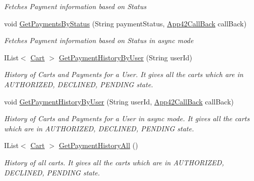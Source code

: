 \begin{DoxyCompactItemize}
\begin{DoxyCompactList}\small\item\em Fetches Payment information based on Status \end{DoxyCompactList}\item 
void \hyperlink{classcom_1_1shephertz_1_1app42_1_1paas_1_1sdk_1_1csharp_1_1shopping_1_1_cart_service_ad0ac4c348e543623ddf70326435543e8}{Get\+Payments\+By\+Status} (String payment\+Status, \hyperlink{interfacecom_1_1shephertz_1_1app42_1_1paas_1_1sdk_1_1csharp_1_1_app42_call_back}{App42\+Call\+Back} call\+Back)
\begin{DoxyCompactList}\small\item\em Fetches Payment information based on Status in async mode \end{DoxyCompactList}\item 
I\+List$<$ \hyperlink{classcom_1_1shephertz_1_1app42_1_1paas_1_1sdk_1_1csharp_1_1shopping_1_1_cart}{Cart} $>$ \hyperlink{classcom_1_1shephertz_1_1app42_1_1paas_1_1sdk_1_1csharp_1_1shopping_1_1_cart_service_afd77d53a3de789e28b9eeabffeca3e83}{Get\+Payment\+History\+By\+User} (String user\+Id)
\begin{DoxyCompactList}\small\item\em History of Carts and Payments for a User. It gives all the carts which are in A\+U\+T\+H\+O\+R\+I\+Z\+E\+D, D\+E\+C\+L\+I\+N\+E\+D, P\+E\+N\+D\+I\+N\+G state. \end{DoxyCompactList}\item 
void \hyperlink{classcom_1_1shephertz_1_1app42_1_1paas_1_1sdk_1_1csharp_1_1shopping_1_1_cart_service_a4135f1449967d0c73ea21d872e4aed38}{Get\+Payment\+History\+By\+User} (String user\+Id, \hyperlink{interfacecom_1_1shephertz_1_1app42_1_1paas_1_1sdk_1_1csharp_1_1_app42_call_back}{App42\+Call\+Back} call\+Back)
\begin{DoxyCompactList}\small\item\em History of Carts and Payments for a User in async mode. It gives all the carts which are in A\+U\+T\+H\+O\+R\+I\+Z\+E\+D, D\+E\+C\+L\+I\+N\+E\+D, P\+E\+N\+D\+I\+N\+G state. \end{DoxyCompactList}\item 
I\+List$<$ \hyperlink{classcom_1_1shephertz_1_1app42_1_1paas_1_1sdk_1_1csharp_1_1shopping_1_1_cart}{Cart} $>$ \hyperlink{classcom_1_1shephertz_1_1app42_1_1paas_1_1sdk_1_1csharp_1_1shopping_1_1_cart_service_aba4ef89555d7bf9ee85c131066b4f1dd}{Get\+Payment\+History\+All} ()
\begin{DoxyCompactList}\small\item\em History of all carts. It gives all the carts which are in A\+U\+T\+H\+O\+R\+I\+Z\+E\+D, D\+E\+C\+L\+I\+N\+E\+D, P\+E\+N\+D\+I\+N\+G state. \end{DoxyCompactList}\item 

\end{DoxyCompactItemize}

